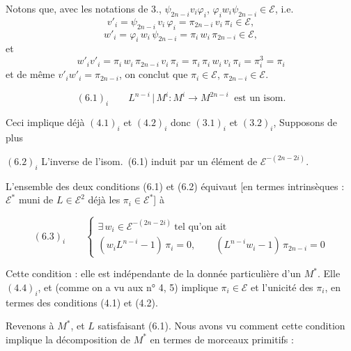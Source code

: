 \documentclass[11pt,a4paper]{article}
\begin{document}
Notons que, avec les notations de 3., \struck{\ill{}}
$\psi_{2n-i} v_{i} \varphi_{i}$, $\varphi_{i} w_{i} \psi_{2n-i} \in
\mathcal{E}$, i.e.
\[ v'_{i} = \psi_{2n-i}\, v_{i}\, \varphi_{i} = \pi_{2n-i}\, v_{i}\, \pi_{i} \in \mathcal{E} , \]
\[ w'_{i} = \varphi_{i}\, w_{i}\, \psi_{2n-i} = \pi_{i}\, w_{i}\, \pi_{2n-i} \in \mathcal{E} , \]
et 
\[ w'_{i} v'_{i} = \pi_{i}\, w_{i}\, \pi_{2n-i}\, v_{i}\, \pi_{i} = \pi_{i}\, \pi_{i}\, w_{i}\, v_{i}\, \pi_{i} = \pi_{i}^{3} = \pi_{i} \]
et de même $v'_{i} w'_{i} = \pi_{2n-i}$, on conclut que $\pi_{i} \in
\mathcal{E}$, $\pi_{2n-i} \in \mathcal{E}$.


\[ (6.1)_{i} \qquad L^{n-i} \,|\, M^{i} \colon M^{i} \to M^{2n-i} \ \text{ est un isom.} \]

Ceci implique déjà $(4.1)_{i}$ et $(4.2)_{i}$ donc $(3.1)_{i}$ et $(3.2)_{i}$,
 Supposons de plus

$(6.2)_{i}$ \quad L'inverse de l'isom.\ (6.1)  induit par un élément de
$\mathcal{E}^{-(2n-2i)}$.


 L'ensemble des deux conditions (6.1) et (6.2) équivaut [en termes
intrinsèques : $\mathcal{E}^{*}$ muni de $L \in \mathcal{E}^{2}$ \ill{}
 déjà les $\pi_{i} \in \mathcal{E}^{*}$] à

\[ (6.3)_{i} \qquad \begin{cases} \exists\, w_{i} \in \mathcal{E}^{-(2n-2i)} \ \text{tel qu'on ait} \\[2pt] (w_{i} L^{n-i} - 1)\, \pi_{i} = 0 , \qquad (L^{n-i} w_{i} - 1)\, \pi_{2n-i} = 0 \end{cases} \]

Cette condition \ill{} : elle est indépendante de la donnée particulière d'un
$M^{*}$.  Elle \ill{} $(4.4)_{i}$, et
(comme on a vu aux n° 4, 5) implique $\pi_{i} \in \mathcal{E}$ et l'unicité des
$\pi_{i}$, en termes des conditions (4.1) et (4.2).

Revenons à $M^{*}$, et $L$ satisfaisant (6.1). Nous avons vu comment
\struck{\ill{}} cette condition implique la décomposition de $M^{*}$ en termes de
morceaux primitifs :
\end{document}
